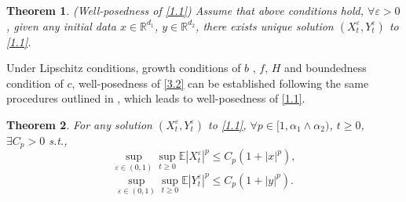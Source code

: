 \documentclass[11pt,reqno]{amsart}
\newtheorem{theorem}{\indent Theorem}[section]
\numberwithin{equation}{section}
\begin{document}
\begin{theorem}\label{T31}
(Well-posedness of \eqref{1.1}) Assume that above conditions hold, $\forall \varepsilon >0$, given any initial data $x\in \mathbb{R}^{d_{1} }$, $y \in \mathbb{R}^{d_{2} }$, there exists unique solution $(X_{t}^{\varepsilon},Y_{t}^{\varepsilon})$ to \eqref{1.1}.
\end{theorem}
Under Lipschitz conditions, growth conditions of $b$ , $f$, $H$ and boundedness condition of $c$,	well-posedness of \eqref{3.2} can be  established following the same procedures outlined in  \cite[Theorem 6.2.3, Theorem 6.2.9, Theorem 6.2.11]{DA}, which leads to well-posedness of \eqref{1.1}.
\begin{theorem}\label{T32}
	For any solution $(X_{t}^{\varepsilon},Y_{t}^{\varepsilon})$ to \eqref{1.1}, $\forall p\in [1,\alpha_{1}\wedge\alpha_{2})$,  $t\geq0$, $\exists C_{p}>0$ s.t.,
	\begin{equation}\label{3.4}
		\sup_{\varepsilon\in (0,1)}\sup_{t\geq0} \mathbb{E}|X_{t}^{\varepsilon}|^{p}\leq C_{p}(1+|x|^{p}),
	\end{equation}
	\begin{equation}\label{3.6}
		\sup_{\varepsilon\in (0,1)}\sup_{t\geq0}\mathbb{E} |Y_{t}^{\varepsilon}|^{p}\leq  C_{p}(1+|y|^{p}).
	\end{equation}
\end{theorem}
\end{document}
